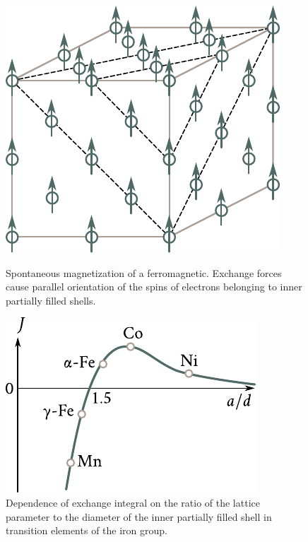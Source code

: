 \begin{figure}[!t]
	\begin{minipage}[t]{0.47\linewidth}
		\begin{center}
            \includegraphics[scale=0.85]{figures/ch_07/fig_7_15.pdf}
    		\caption[]{Spontaneous magnetization of a ferromagnetic. Exchange forces cause parallel orientation of the spins of electrons belonging to inner partially filled shells.}
    		\label{fig:7_15}
		\end{center}
	\end{minipage}
	\hfill{ }%
	\begin{minipage}[t]{0.48\linewidth}
		\begin{center}
			\includegraphics[scale=0.95]{figures/ch_07/fig_7_16.pdf}
			\caption[]{Dependence of exchange integral on the ratio of the lattice parameter to the diameter of the inner partially filled  shell in transition elements of the iron group.}
			\label{fig:7_16}
		\end{center}
	\end{minipage}
\vspace{-0.3cm}
\end{figure}

